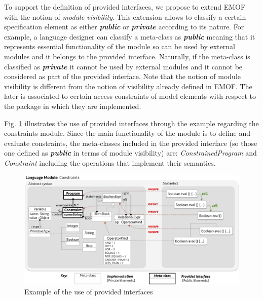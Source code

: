 To support the definition of provided interfaces, we propose to extend EMOF with the notion of \textit{module visibility}. This extension allows to classify a certain specification element as either \textsl{\textbf{public}} or \textsl{\textbf{private}} according to its nature. For example, a language designer can classify a meta-class as \textsl{\textbf{public}} meaning that it represents essential functionality of the module so can be used by external modules and it belongs to the provided interface. Naturally, if the meta-class is classified as \textsl{\textbf{private}} it cannot be used by external modules and it cannot be considered as part of the provided interface. Note that the notion of module visibility is different from the notion of visibility already defined in EMOF. The later is associated to  certain access constraints of model elements with respect to the package in which they are implemented.

Fig. \ref{fig:fig-prov-example-fig} illustrates the use of provided interfaces through the example regarding the constraints module. Since the main functionality of the module is to define and evaluate constraints, the meta-classes included in the provided interface (so those one defined as \textsl{\textbf{public}} in terms of module visibility) are: \textsl{ConstrainedProgram} and \textsl{Constraint} including the operations that implement their semantics.

\begin{figure}
  \centering\includegraphics[width=1\linewidth]{images/fig-prov-example-fig.png}
  \caption{Example of the use of provided interfaces}
  \label{fig:fig-prov-example-fig}
\end{figure}

